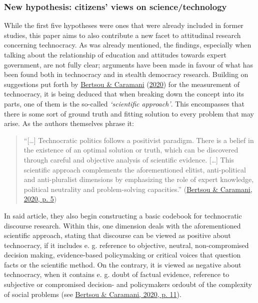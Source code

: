 \documentclass[
  12pt,
  english,
]{article}
\begin{document}
\hypertarget{new-hypothesis-citizens-views-on-sciencetechnology}{%
\subsubsection{New hypothesis: citizens' views on
science/technology}\label{new-hypothesis-citizens-views-on-sciencetechnology}}

While the first five hypotheses were ones that were already included in
former studies, this paper aims to also contribute a new facet to
attitudinal research concerning technocracy. As was already mentioned,
the findings, especially when talking about the relationship of
education and attitudes towards expert government, are not fully clear;
arguments have been made in favour of what has been found both in
technocracy and in stealth democracy research. Building on suggestions
put forth by \protect\hyperlink{ref-bertsou2020measuring}{Bertsou \&
Caramani} (\protect\hyperlink{ref-bertsou2020measuring}{2020}) for the
measurement of technocracy, it is being deduced that when breaking down
the concept into its parts, one of them is the so-called
\emph{`scientific approach'}. This encompasses that there is some sort
of ground truth and fitting solution to every problem that may arise. As
the authors themselves phrase it:

\begin{quote}
``{[}\ldots{]} Technocratic politics follows a positivist paradigm.
There is a belief in the existence of an optimal solution or truth,
which can be discovered through careful and objective analysis of
scientific evidence. {[}\ldots{]} This scientific approach complements
the aforementioned elitist, anti-political and anti-pluralist dimensions
by emphasizing the role of expert knowledge, political neutrality and
problem-solving capacities.''
(\protect\hyperlink{ref-bertsou2020measuring}{Bertsou \& Caramani, 2020,
p. 5})
\end{quote}

In said article, they also begin constructing a basic codebook for
technocratic discourse research. Within this, one dimension deals with
the aforementioned scientific approach, stating that discourse can be
viewed as positive about technocracy, if it includes e. g. reference to
objective, neutral, non-compromised decision making, evidence-based
policymaking or critical voices that question facts or the scientific
method. On the contrary, it is viewed as negative about technocracy,
when it contains e. g. doubt of factual evidence, reference to
subjective or compromised decision- and policymakers ordoubt of the
complexity of social problems (see
\protect\hyperlink{ref-bertsou2020measuring}{Bertsou \& Caramani, 2020,
p. 11}).
\end{document}

